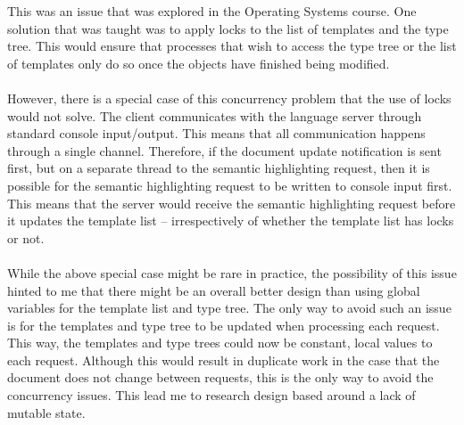 \documentclass[../main.tex]{subfiles}
\begin{document}
This was an issue that was explored in the Operating Systems course. One solution that was taught was to apply locks to the list of templates and the type tree. This would ensure that processes that wish to access the type tree or the list of templates only do so once the objects have finished being modified.
\\
\\
However, there is a special case of this concurrency problem that the use of locks would not solve. The client communicates with the language server through standard console input/output. This means that all communication happens through a single channel. Therefore, if the document update notification is sent first, but on a separate thread to the semantic highlighting request, then it is possible for the semantic highlighting request to be written to console input first. This means that the server would receive the semantic highlighting request before it updates the template list -- irrespectively of whether the template list has locks or not.
\\
\\
While the above special case might be rare in practice, the possibility of this issue hinted to me that there might be an overall better design than using global variables for the template list and type tree. The only way to avoid such an issue is for the templates and type tree to be updated when processing each request. This way, the templates and type trees could now be constant, local values to each request. Although this would result in duplicate work in the case that the document does not change between requests, this is the only way to avoid the concurrency issues. This lead me to research design based around a lack of mutable state.
\end{document}

